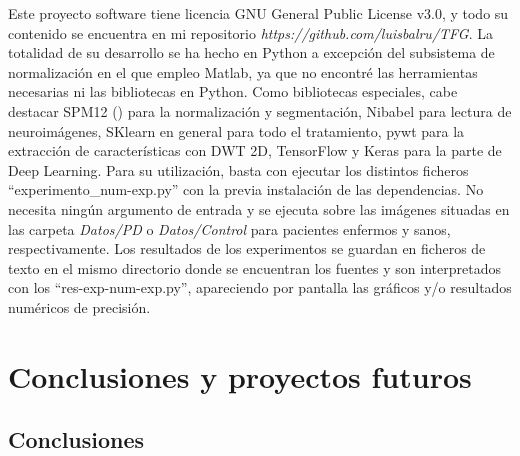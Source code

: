 Este proyecto software tiene licencia GNU General Public License v3.0, y todo su contenido se encuentra en mi repositorio \textit{https://github.com/luisbalru/TFG}. La totalidad de su desarrollo se ha hecho en Python a excepción del subsistema de normalización en el que empleo Matlab, ya que no encontré las herramientas necesarias ni las bibliotecas en Python. Como bibliotecas especiales, cabe destacar SPM12 (\cite{spm}) para la normalización y segmentación, Nibabel para lectura de neuroimágenes, SKlearn en general para todo el tratamiento, pywt para la extracción de características con DWT 2D, TensorFlow y Keras para la parte de Deep Learning. Para su utilización, basta con ejecutar los distintos ficheros ``experimento\_num-exp.py'' con la previa instalación de las dependencias. No necesita ningún argumento de entrada y se ejecuta sobre las imágenes situadas en las carpeta \textit{Datos/PD} o \textit{Datos/Control} para pacientes enfermos y sanos, respectivamente. Los resultados de los experimentos se guardan en ficheros de texto en el mismo directorio donde se encuentran los fuentes y son interpretados con los ``res-exp-num-exp.py'', apareciendo por pantalla las gráficos y/o resultados numéricos de precisión. 
\newpage

\section{Conclusiones y proyectos futuros} 

\subsection{Conclusiones}

